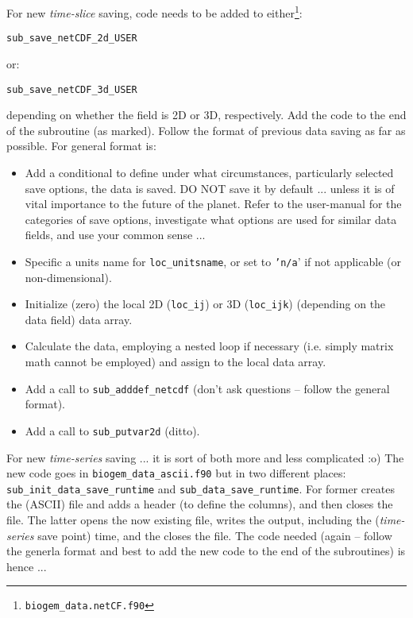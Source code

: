 \documentclass[11pt,fleqn]{book} %
\begin{document}
For new \textit{time-slice} saving, code needs to be added to either\footnote{\texttt{biogem\_data.netCF.f90}}:
\vspace{-1mm}\small\begin{verbatim}
sub_save_netCDF_2d_USER
\end{verbatim}\vspace{-1mm}\normalsize
or:
\vspace{-1mm}\small\begin{verbatim}
sub_save_netCDF_3d_USER
\end{verbatim}\vspace{-1mm}\normalsize
depending on whether the field is 2D or 3D, respectively. Add the code to the end of the subroutine (as marked). Follow the format of previous data saving as far as possible. For general format is:
\begin{itemize}[noitemsep]
\item Add a conditional to define under what circumstances, particularly selected save options, the data is saved. DO NOT save it by default ... unless it is of vital importance to the future of the planet. Refer to the user-manual for the categories of save options, investigate what options are used for similar data fields, and use your common sense ...
\item Specific a units name for \texttt{loc\_unitsname}, or set to \texttt{'n/a}' if not applicable (or non-dimensional).
\item Initialize (zero) the local 2D (\texttt{loc\_ij}) or 3D (\texttt{loc\_ijk}) (depending on the data field) data array.
\item Calculate the data, employing a nested loop if necessary (i.e. simply matrix math cannot be employed) and assign to the local data array.
\item Add a call to \texttt{sub\_adddef\_netcdf} (don't ask questions -- follow the general format).
\item Add a call to \texttt{sub\_putvar2d} (ditto).
\end{itemize}

For new \textit{time-series} saving ... it is sort of both more and less complicated :o) The new code goes in \texttt{biogem\_data\_ascii.f90} but in two different places: \texttt{sub\_init\_data\_save\_runtime} and \texttt{sub\_data\_save\_runtime}. For former creates the (ASCII) file and adds a header (to define the columns), and then closes the file. The latter opens the now existing file, writes the output, including the (\textit{time-series} save point) time, and the closes the file. The code needed (again -- follow the generla format and best to add the new code to the end of the subroutines) is hence ...
\end{document}
